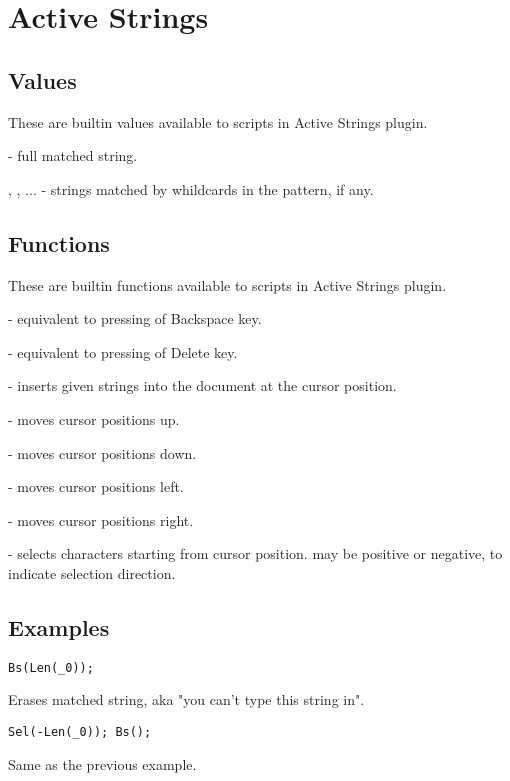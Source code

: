 \chapter{Active Strings}

\section{Values}

These are builtin values available to scripts in Active Strings plugin.

 - full matched string.

, , ... - strings matched by whildcards in the 
pattern, if any.


\section{Functions}

These are builtin functions available to scripts in Active Strings plugin.

 - equivalent to  pressing of Backspace key.

 - equivalent to  pressing of Delete key.

 - inserts given strings into the document at the 
cursor position.

 - moves cursor  positions up.

 - moves cursor  positions down.

 - moves cursor  positions left.

 - moves cursor  positions right.

 - selects  characters starting from cursor
position.  may be positive or negative, to indicate selection
direction.


\section{Examples}

\begin{verbatim}
Bs(Len(_0));
\end{verbatim}
Erases matched string, aka "you can't type this string in".

\begin{verbatim}
Sel(-Len(_0)); Bs();
\end{verbatim}
Same as the previous example.
